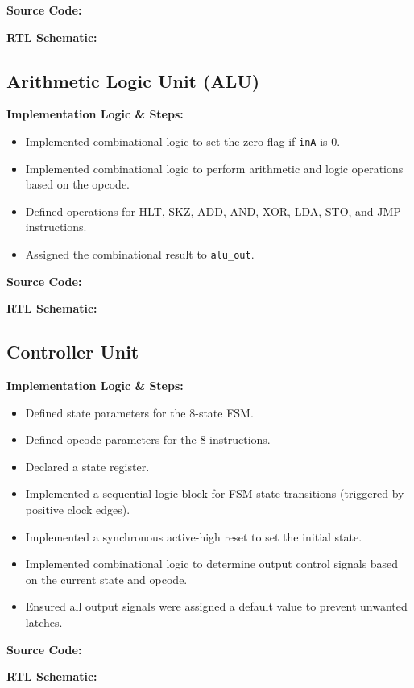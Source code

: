 \textbf{Source Code:}

\textbf{RTL Schematic:}

\subsection{Arithmetic Logic Unit (ALU)}
\textbf{Implementation Logic \& Steps:}
\begin{itemize}
	\item Implemented combinational logic to set the zero flag if \texttt{inA} is 0.
	\item Implemented combinational logic to perform arithmetic and logic operations based on the opcode.
	\item Defined operations for HLT, SKZ, ADD, AND, XOR, LDA, STO, and JMP instructions.
	\item Assigned the combinational result to \texttt{alu\_out}.
\end{itemize}

\textbf{Source Code:}

\textbf{RTL Schematic:}

\subsection{Controller Unit}
\textbf{Implementation Logic \& Steps:}
\begin{itemize}
	\item Defined state parameters for the 8-state FSM.
	\item Defined opcode parameters for the 8 instructions.
	\item Declared a state register.
	\item Implemented a sequential logic block for FSM state transitions (triggered by positive clock edges).
	\item Implemented a synchronous active-high reset to set the initial state.
	\item Implemented combinational logic to determine output control signals based on the current state and opcode.
	\item Ensured all output signals were assigned a default value to prevent unwanted latches.
\end{itemize}

\textbf{Source Code:}

\textbf{RTL Schematic:}

